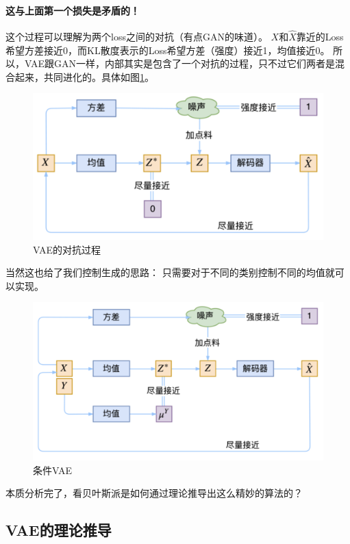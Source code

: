 \paragraph{这与上面第一个损失是矛盾的！}
这个过程可以理解为两个loss之间的对抗（有点GAN的味道）。
$X$和$\hat{X}$靠近的Loss希望方差接近0，而KL散度表示的Loss希望方差（强度）接近1，均值接近0。
所以，VAE跟GAN一样，内部其实是包含了一个对抗的过程，只不过它们两者是混合起来，共同进化的。具体如图\ref{fig:vae_adversarial}。
\begin{figure}[htbp]
    \centering
    \includegraphics[width=\textwidth]{figures/chapter2/normalvae.png}
    \caption{VAE的对抗过程}
    \label{fig:vae_adversarial}
\end{figure}
当然这也给了我们控制生成的思路：\newline
只需要对于不同的类别控制不同的均值就可以实现。
\begin{figure}[htbp]
    \centering
    \includegraphics[width=\textwidth]{figures/chapter2/cond_vae.png}
    \caption{条件VAE}
    \label{fig:cond_vae}
\end{figure}
本质分析完了，看贝叶斯派是如何通过理论推导出这么精妙的算法的？

\subsection{VAE的理论推导}
